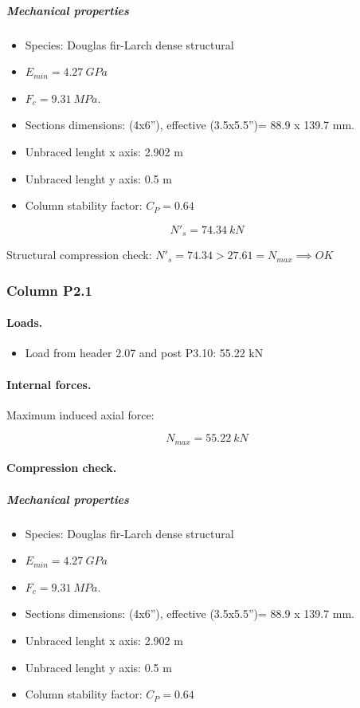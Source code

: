 \subparagraph{Mechanical properties}

\begin{itemize}
\item Species: Douglas fir-Larch dense structural
\item $E_{min}= 4.27\ GPa$
\item $F_c= 9.31\ MPa$.
\item Sections dimensions: (4x6''), effective (3.5x5.5'')= 88.9 x 139.7  mm.
\item Unbraced lenght x axis: 2.902 m
\item Unbraced lenght y axis: 0.5 m
\item Column stability factor: $C_P= 0.64$
\end{itemize}

\begin{equation}
  N'_s= 74.34\ kN
\end{equation}

\noindent Structural compression check: $N'_s = 74.34 > 27.61 = N_{max} \implies OK$

\subsubsection{Column P2.1}

\paragraph{Loads.}

\begin{itemize}
\item Load from header 2.07 and post P3.10: 55.22 kN
\end{itemize}

\paragraph{Internal forces.}

\noindent Maximum induced axial force:

\begin{equation}
  N_{max}= 55.22\ kN
\end{equation}

\paragraph{Compression check.}

\subparagraph{Mechanical properties}

\begin{itemize}
\item Species: Douglas fir-Larch dense structural
\item $E_{min}= 4.27\ GPa$
\item $F_c= 9.31\ MPa$.
\item Sections dimensions: (4x6''), effective (3.5x5.5'')= 88.9 x 139.7  mm.
\item Unbraced lenght x axis: 2.902 m
\item Unbraced lenght y axis: 0.5 m
\item Column stability factor: $C_P= 0.64$
\end{itemize}

